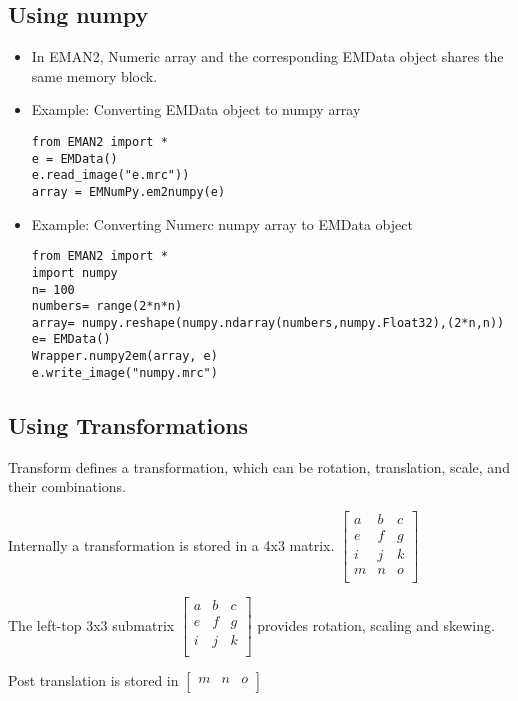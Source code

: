     \subsection{Using numpy} 
    \begin{itemize}
      \item
	In EMAN2,  Numeric array and the corresponding EMData object shares the same memory block.
      \item
	Example: Converting EMData object to numpy array
	{
	\begin {verbatim}from EMAN2 import *
e = EMData()
e.read_image("e.mrc"))
array = EMNumPy.em2numpy(e)\end{verbatim}}
      \item
	Example: Converting Numerc numpy array to EMData object
	{
	\begin{verbatim}from EMAN2 import *
import numpy
n= 100
numbers= range(2*n*n)
array= numpy.reshape(numpy.ndarray(numbers,numpy.Float32),(2*n,n))
e= EMData()
Wrapper.numpy2em(array, e)
e.write_image("numpy.mrc")\end{verbatim}}
    \end{itemize}

    \subsection{Using Transformations} 
    Transform defines a transformation, which can be rotation,
    translation, scale, and their combinations.
    
    Internally a transformation is stored in a 4x3 matrix.
    \( \left[ \begin{array}{ccc}
        a&b&c\\
        e&f&g\\
        i&j&k\\
         m&n&o\\
      \end{array} \right] \)
    
    The left-top 3x3 submatrix
    \(\left[ \begin{array}{ccc}
        a& b& c\\
         e& f& g\\
         i& j& k\\
      \end{array} \right] \) 
    provides rotation, scaling and skewing.
    
    Post translation is stored in 
      \( \left[ \begin{array}{ccc}
	  m&n&o\\
	\end{array} \right] \)
      
